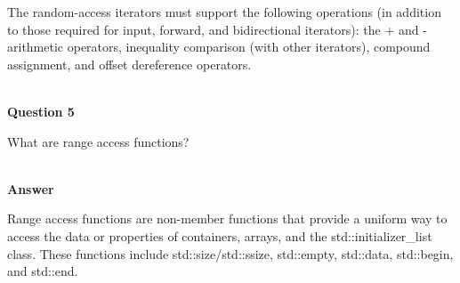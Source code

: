The random-access iterators must support the following operations (in addition to those required for input, forward, and bidirectional iterators): the + and - arithmetic operators, inequality comparison (with other iterators), compound assignment, and offset dereference operators.

\hspace*{\fill} \\ %
\noindent
\textbf{Question 5}

What are range access functions?

\hspace*{\fill} \\ %
\noindent
\textbf{Answer}

Range access functions are non-member functions that provide a uniform way to access the data or properties of containers, arrays, and the std::initializer\_list class. These functions include std::size/std::ssize, std::empty, std::data, std::begin, and std::end.












